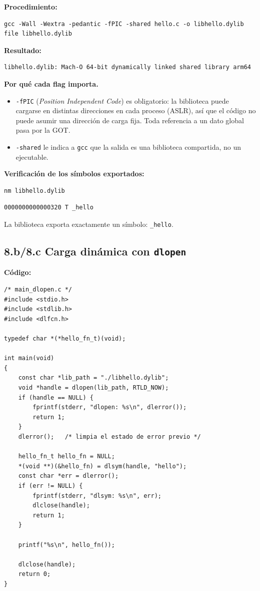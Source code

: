 \documentclass[11pt,a4paper]{article}
\begin{document}
\textbf{Procedimiento:}

\begin{lstlisting}
gcc -Wall -Wextra -pedantic -fPIC -shared hello.c -o libhello.dylib
file libhello.dylib
\end{lstlisting}

\textbf{Resultado:}

\begin{lstlisting}[style=outstyle]
libhello.dylib: Mach-O 64-bit dynamically linked shared library arm64
\end{lstlisting}

\textbf{Por qué cada flag importa.}
\begin{itemize}[leftmargin=*, itemsep=0pt]
    \item \texttt{-fPIC} (\emph{Position Independent Code}) es
        obligatorio: la biblioteca puede cargarse en distintas
        direcciones en cada proceso (ASLR), así que el código no
        puede asumir una dirección de carga fija. Toda referencia a
        un dato global pasa por la GOT.
    \item \texttt{-shared} le indica a \texttt{gcc} que la salida es
        una biblioteca compartida, no un ejecutable.
\end{itemize}

\textbf{Verificación de los símbolos exportados:}

\begin{lstlisting}
nm libhello.dylib
\end{lstlisting}

\begin{lstlisting}[style=outstyle]
0000000000000320 T _hello
\end{lstlisting}

La biblioteca exporta exactamente un símbolo: \texttt{\_hello}.

\subsection*{8.b/8.c Carga dinámica con \texttt{dlopen}}

\textbf{Código:}

\begin{lstlisting}[style=cstyle]
/* main_dlopen.c */
#include <stdio.h>
#include <stdlib.h>
#include <dlfcn.h>

typedef char *(*hello_fn_t)(void);

int main(void)
{
    const char *lib_path = "./libhello.dylib";
    void *handle = dlopen(lib_path, RTLD_NOW);
    if (handle == NULL) {
        fprintf(stderr, "dlopen: %s\n", dlerror());
        return 1;
    }
    dlerror();   /* limpia el estado de error previo */

    hello_fn_t hello_fn = NULL;
    *(void **)(&hello_fn) = dlsym(handle, "hello");
    const char *err = dlerror();
    if (err != NULL) {
        fprintf(stderr, "dlsym: %s\n", err);
        dlclose(handle);
        return 1;
    }

    printf("%s\n", hello_fn());

    dlclose(handle);
    return 0;
}
\end{lstlisting}
\end{document}
